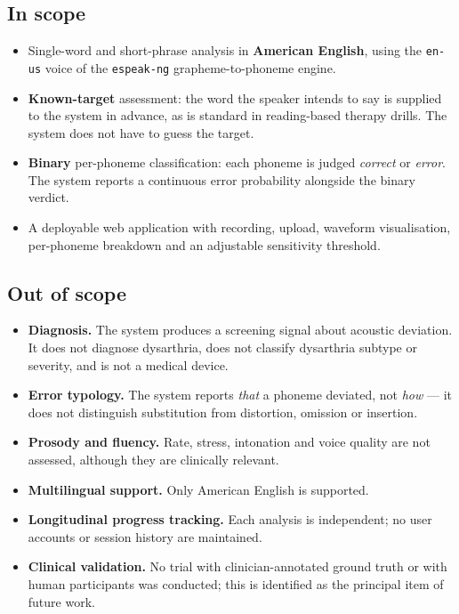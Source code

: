 \subsection{In scope}

\begin{itemize}[leftmargin=*]
  \item Single-word and short-phrase analysis in \textbf{American English},
        using the \texttt{en-us} voice of the \texttt{espeak-ng}
        grapheme-to-phoneme engine.
  \item \textbf{Known-target} assessment: the word the speaker intends to say
        is supplied to the system in advance, as is standard in reading-based
        therapy drills. The system does not have to guess the target.
  \item \textbf{Binary} per-phoneme classification: each phoneme is judged
        \emph{correct} or \emph{error}. The system reports a continuous error
        probability alongside the binary verdict.
  \item A deployable web application with recording, upload, waveform
        visualisation, per-phoneme breakdown and an adjustable sensitivity
        threshold.
\end{itemize}

\subsection{Out of scope}

\begin{itemize}[leftmargin=*]
  \item \textbf{Diagnosis.} The system produces a screening signal about
        acoustic deviation. It does not diagnose dysarthria, does not classify
        dysarthria subtype or severity, and is not a medical device.
  \item \textbf{Error typology.} The system reports \emph{that} a phoneme
        deviated, not \emph{how} --- it does not distinguish substitution from
        distortion, omission or insertion.
  \item \textbf{Prosody and fluency.} Rate, stress, intonation and voice
        quality are not assessed, although they are clinically relevant.
  \item \textbf{Multilingual support.} Only American English is supported.
  \item \textbf{Longitudinal progress tracking.} Each analysis is independent;
        no user accounts or session history are maintained.
  \item \textbf{Clinical validation.} No trial with clinician-annotated ground
        truth or with human participants was conducted; this is identified as
        the principal item of future work.
\end{itemize}

